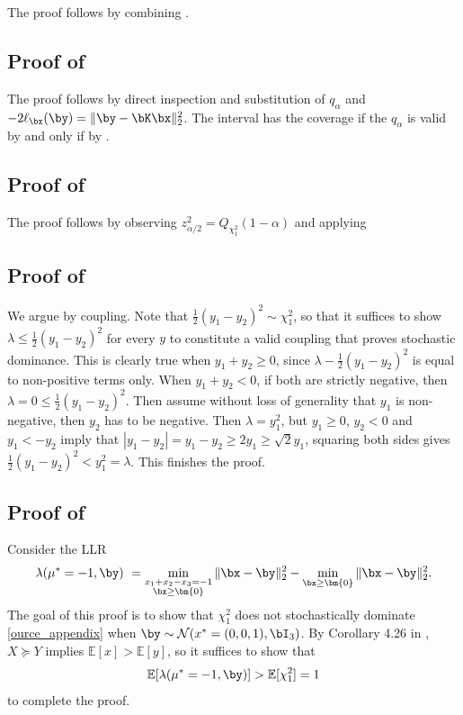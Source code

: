 \documentclass[11pt]{article}
\numberwithin{equation}{section}
\numberwithin{figure}{section}
\begin{document}
The proof follows by combining .

\subsection{Proof of }
\label{sec:proof:lemma:burruschi2}

The proof follows by direct inspection and substitution of $q_\alpha$ and $-2\ell_{\bx}(\by) = \lVert \by - \bK \bx \rVert_2^2$. The interval has the coverage if the $q_\alpha$ is valid by  and only if by .

\subsection{Proof of }
\label{sec:proof:lemma:burruschi2B}

The proof follows by observing $z^2_{\alpha/2} = Q_{\chi^2_1}(1-\alpha)$ and applying 

\subsection{Proof of }
\label{proof:invalidity-counterexample}

We argue by coupling. Note that $\frac 1 2 (y_1-y_2)^2 \sim \chi^2_1$, so that it suffices to show $\lambda \leq \frac 1 2 (y_1-y_2)^2$ for every $y$ to constitute a valid coupling that proves stochastic dominance. 
This is clearly true when $y_1 + y_2 \geq 0$, since $\lambda- \frac 1 2 (y_1-y_2)^2$ is equal to non-positive terms only. 
When $y_1+y_2 < 0$, if both are strictly negative, then $\lambda = 0 \leq \frac 1 2 (y_1-y_2)^2$. 
Then assume without loss of generality that $y_1$ is non-negative, then $y_2$ has to be negative. 
Then $\lambda = y_1^2$, but $y_1 \geq 0$, $y_2 < 0$ and $y_1 < - y_2$ imply that $|y_1 - y_2| = y_1 - y_2 \geq 2y_1 \geq \sqrt{2}y_1$, squaring both sides gives $\frac{1}{2}(y_1-y_2)^2 < y_1^2 = \lambda$. 
This finishes the proof.

\subsection{Proof of }\label{ProofCounter}

Consider the LLR
\begin{equation}\label{ource_appendix}
\lambda(\mu^* = -1, \by) ~= \min_{\substack{x_1 + x_2 -x_3 = -1\\ \bx \geq \bm{0}}} \Vert \bx -\by \Vert^2_2 - \min_{\bx \geq \bm{0} } \Vert \bx-\by \Vert^2_2.
\end{equation}
The goal of this proof is to show that $\chi^2_1$ does not stochastically dominate 
\eqref{ource_appendix} when $\by \sim \mathcal{N}(x^* = (0,0,1), \bI_3)$. By Corollary 4.26 in \cite{ProbabilityBook}, $X \succeq Y$ implies $\mathbb E[x] > \mathbb E[y]$, so it suffices to show that 
\[
    \mathbb E[\lambda(\mu^* = -1, \by)] > \mathbb E[\chi^2_1] = 1
\]
to complete the proof.
\end{document}
